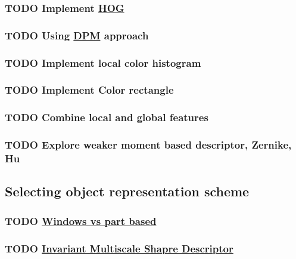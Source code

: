 \documentclass[11pt]{article}
\begin{document}
\subsubsection{{\bfseries\sffamily TODO} Implement \href{http://vc.cs.nthu.edu.tw/home/paper/codfiles/hkchiu/201205170946/Histograms\%20of\%20Oriented\%20Gradients\%20for\%20Human\%20Detection.pdf}{HOG}}
\label{sec:orgf435f3a}
\subsubsection{{\bfseries\sffamily TODO} Using \href{http://people.cs.uchicago.edu/\~pff/papers/lsvm-pami.pdf}{DPM} approach}
\label{sec:orgd45ae86}
\subsubsection{{\bfseries\sffamily TODO} Implement local color histogram}
\label{sec:orgbc9d890}
\subsubsection{{\bfseries\sffamily TODO} Implement Color rectangle}
\label{sec:org26dba10}
\subsubsection{{\bfseries\sffamily TODO} Combine local and global features}
\label{sec:orgf85450d}
\subsubsection{{\bfseries\sffamily TODO} Explore weaker moment based descriptor, Zernike, Hu}
\label{sec:org2b39308}
\subsection{Selecting object representation scheme}
\label{sec:orgc7a6703}
\subsubsection{{\bfseries\sffamily TODO} \href{http://web.cs.hacettepe.edu.tr/\~pinar/courses/CMP719/lectures/representation.pdf}{Windows vs part based}}
\label{sec:orgc6d9eb1}
\subsubsection{{\bfseries\sffamily TODO} \href{http://eeeweba.ntu.edu.sg/computervision/Research\%20Papers/2016/Invariant\%20Multi-Scale\%20Shape\%20Descriptor\%20for\%20Object\%20Matching\%20and\%20Recognition.pdf}{Invariant Multiscale Shapre Descriptor}}
\label{sec:orgaac59cd}
\end{document}
